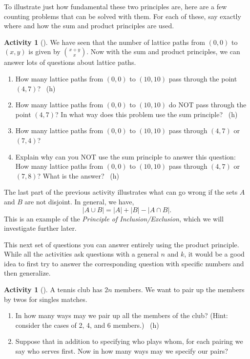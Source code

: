 \documentclass[10pt,]{book}
\theoremstyle{plain}
\theoremstyle{definition}
\theoremstyle{definition}
\theoremstyle{definition}
\newtheorem{activity}[project]{Activity}
\numberwithin{equation}{chapter}
\newcommand{\card}[1]{\left| #1 \right|}
\begin{document}
\hypertarget{p-623}{}%
To illustrate just how fundamental these two principles are, here are a few counting problems that can be solved with them.  For each of these, say exactly where and how the sum and product principles are used.%
\begin{activity}[]\label{act-latticepaths2}
\hypertarget{p-624}{}%
We have seen that the number of lattice paths from \((0,0)\) to \((x,y)\) is given by \(\binom{x+y}{x}\).  Now with the sum and product principles, we can answer lots of questions about lattice paths.%
\begin{enumerate}[font=\bfseries,label=(\alph*),ref=\alph*]
\item\label{task-127} \hypertarget{p-625}{}%
How many lattice paths from \((0,0)\) to \((10,10)\) pass through the point \((4,7)\)?%
~{\tiny (h)}\item\label{task-128} \hypertarget{p-627}{}%
How many lattice paths from \((0,0)\) to \((10,10)\) do NOT pass through the point \((4,7)\)?  In what way does this problem use the sum principle?%
~{\tiny (h)}\item\label{task-129} \hypertarget{p-629}{}%
How many lattice paths from \((0,0)\) to \((10,10)\) pass through \((4,7)\) or \((7,4)\)?%
\item\label{task-130} \hypertarget{p-630}{}%
Explain why can you NOT use the sum principle to answer this question: How many lattice paths from \((0,0)\) to \((10,10)\) pass through \((4,7)\) or \((7,8)\)?  What is the answer?%
~{\tiny (h)}\end{enumerate}
\end{activity}
\hypertarget{p-632}{}%
The last part of the previous activity illustrates what can go wrong if the sets \(A\) and \(B\) are not disjoint.  In general, we have,%
\begin{equation*}
\card{A \cup B} = \card{A} + \card{B} - \card{A \cap B}.
\end{equation*}
This is an example of the \emph{Principle of Inclusion/Exclusion}, which we will investigate further later.%
\par
\hypertarget{p-633}{}%
This next set of questions you can answer entirely using the product principle.  While all the activities ask questions with a general \(n\) and \(k\), it would be a good idea to first try to answer the corresponding question with specific numbers and then generalize.%
\begin{activity}[]\label{tennispairings1}
\hypertarget{p-634}{}%
A tennis club has \(2n\) members. We want to pair up the members by twos for singles matches.%
\begin{enumerate}[font=\bfseries,label=(\alph*),ref=\alph*]
\item\label{task-131} \hypertarget{p-635}{}%
In how many ways may we pair up all the members of the club? (Hint: consider the cases of 2, 4, and 6 members.)%
~{\tiny (h)}\item\label{task-132} \hypertarget{p-638}{}%
Suppose that in addition to specifying who plays whom, for each pairing we say who serves first.  Now in how many ways may we specify our pairs?%
\end{enumerate}
\end{activity}
\end{document}
